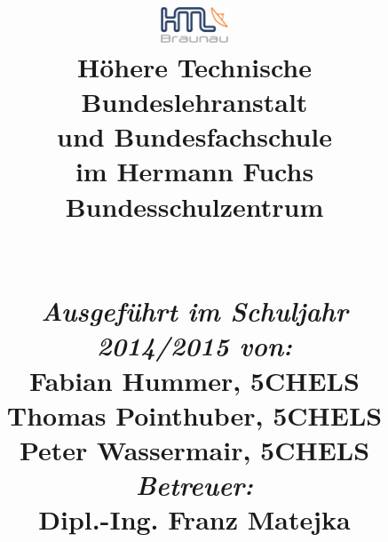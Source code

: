 
\begin{titlepage}
\title{
%
{\includegraphics[width=0.15\textwidth]{./includes/htl_c_cmyk_rein.pdf}}
%
\\{\normalsize \textbf{Höhere Technische Bundeslehranstalt}}
\\[-0.4em] {\normalsize \textbf{und Bundesfachschule}}
\\[-0.4em] {\normalsize im Hermann Fuchs Bundesschulzentrum}
%
\\\vspace{3cm}{ \textbf{\htlArbeitsthema}}
%
\\\vspace{0.5cm} {\Large \textsc{\htlArbeit}}
%
\\\vspace{5cm}
%
{\normalsize \emph{Ausgeführt im Schuljahr 2014/2015 von:}}
\\{\normalsize Fabian Hummer, 5CHELS}
\\[-0.4em] {\normalsize Thomas Pointhuber, 5CHELS}
\\[-0.4em] {\normalsize Peter Wassermair, 5CHELS}
\\[1.0em] {\normalsize \emph{Betreuer:}}
\\{\normalsize Dipl.-Ing. Franz Matejka}
}		
%
\maketitle
\end{titlepage}
\restoregeometry
\pagebreak
